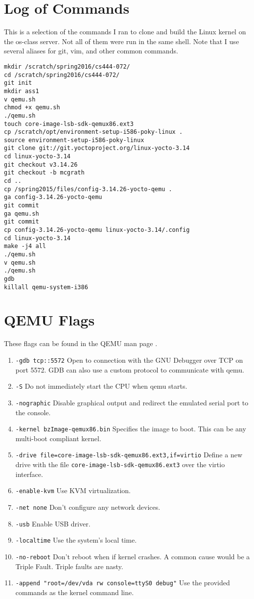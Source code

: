 \documentclass[10pt,conference,draftclsnofoot,onecolumn]{IEEEtran}
\begin{document}
\bigskip
\bigskip
\bigskip

\section{Log of Commands}
This is a selection of the commands I ran to clone and build the Linux kernel
on the os-class server. Not all of them were run in the same shell.
Note that I use several aliases for git, vim, and other common commands.
\begin{verbatim}
mkdir /scratch/spring2016/cs444-072/
cd /scratch/spring2016/cs444-072/
git init
mkdir ass1
v qemu.sh
chmod +x qemu.sh
./qemu.sh
touch core-image-lsb-sdk-qemux86.ext3
cp /scratch/opt/environment-setup-i586-poky-linux .
source environment-setup-i586-poky-linux
git clone git://git.yoctoproject.org/linux-yocto-3.14
cd linux-yocto-3.14
git checkout v3.14.26
git checkout -b mcgrath
cd ..
cp /spring2015/files/config-3.14.26-yocto-qemu .
ga config-3.14.26-yocto-qemu
git commit
ga qemu.sh
git commit
cp config-3.14.26-yocto-qemu linux-yocto-3.14/.config
cd linux-yocto-3.14
make -j4 all
./qemu.sh
v qemu.sh
./qemu.sh
gdb
killall qemu-system-i386
\end{verbatim}

\section{QEMU Flags}
These flags can be found in the QEMU man page \cite{qemu(1)}.
\begin{enumerate}
\item \texttt{-gdb tcp::5572} Open to connection with the GNU Debugger over TCP on port 5572. GDB can also use a custom protocol to communicate with qemu.
\item \texttt{-S} Do not immediately start the CPU when qemu starts.
\item \texttt{-nographic} Disable graphical output and redirect the emulated serial port to the console.
\item \texttt{-kernel bzImage-qemux86.bin} Specifies the image to boot. This can be any multi-boot compliant kernel.
\item \texttt{-drive file=core-image-lsb-sdk-qemux86.ext3,if=virtio} Define a new drive with the file \texttt{core-image-lsb-sdk-qemux86.ext3} over the virtio interface.
\item \texttt{-enable-kvm} Use KVM virtualization.
\item \texttt{-net none} Don't configure any network devices.
\item \texttt{-usb} Enable USB driver.
\item \texttt{-localtime} Use the system's local time.
\item \texttt{-no-reboot} Don't reboot when if kernel crashes. A common cause would be a Triple Fault. Triple faults are nasty.
\item \texttt{-append "root=/dev/vda rw console=ttyS0 debug"} Use the provided commands as the kernel command line.
\end{enumerate}
\end{document}

